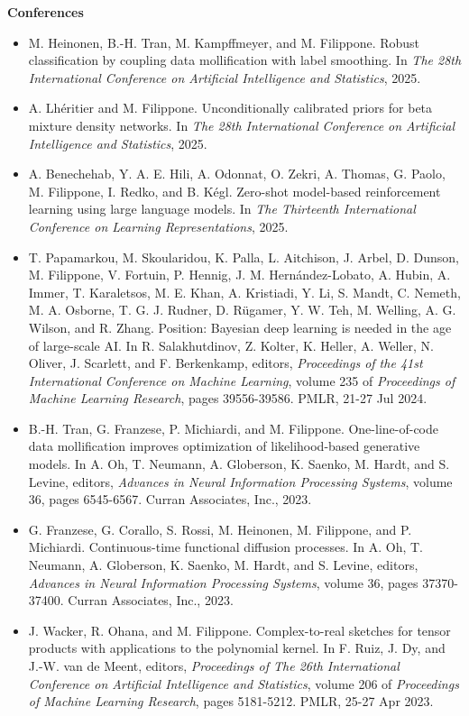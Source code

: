 \begin{itemize}
\end{itemize}\textbf{Conferences}\begin{itemize}\item  M. Heinonen, B.-H. Tran, M. Kampffmeyer, and M. Filippone. Robust classification by coupling data mollification with label smoothing. In \emph{The 28th International Conference on Artificial Intelligence and Statistics}, 2025.  
\item  A. Lh\'eritier and M. Filippone. Unconditionally calibrated priors for beta mixture density networks. In \emph{The 28th International Conference on Artificial Intelligence and Statistics}, 2025.  
\item  A. Benechehab, Y. A. E. Hili, A. Odonnat, O. Zekri, A. Thomas, G. Paolo, M. Filippone, I. Redko, and B. K\'egl. Zero-shot model-based reinforcement learning using large language models. In \emph{The Thirteenth International Conference on Learning Representations}, 2025.  
\item  T. Papamarkou, M. Skoularidou, K. Palla, L. Aitchison, J. Arbel, D. Dunson, M. Filippone, V. Fortuin, P. Hennig, J. M. Hern\'andez-Lobato, A. Hubin, A. Immer, T. Karaletsos, M. E. Khan, A. Kristiadi, Y. Li, S. Mandt, C. Nemeth, M. A. Osborne, T. G. J. Rudner, D. R\"ugamer, Y. W. Teh, M. Welling, A. G. Wilson, and R. Zhang. Position: Bayesian deep learning is needed in the age of large-scale AI. In R. Salakhutdinov, Z. Kolter, K. Heller, A. Weller, N. Oliver, J. Scarlett, and F. Berkenkamp, editors, \emph{Proceedings of the 41st International Conference on Machine Learning}, volume 235 of \emph{Proceedings of Machine Learning Research}, pages 39556-39586. PMLR, 21-27 Jul 2024.  
\item  B.-H. Tran, G. Franzese, P. Michiardi, and M. Filippone. One-line-of-code data mollification improves optimization of likelihood-based generative models. In A. Oh, T. Neumann, A. Globerson, K. Saenko, M. Hardt, and S. Levine, editors, \emph{Advances in Neural Information Processing Systems}, volume 36, pages 6545-6567. Curran Associates, Inc., 2023.  
\item  G. Franzese, G. Corallo, S. Rossi, M. Heinonen, M. Filippone, and P. Michiardi. Continuous-time functional diffusion processes. In A. Oh, T. Neumann, A. Globerson, K. Saenko, M. Hardt, and S. Levine, editors, \emph{Advances in Neural Information Processing Systems}, volume 36, pages 37370-37400. Curran Associates, Inc., 2023.  
\item  J. Wacker, R. Ohana, and M. Filippone. Complex-to-real sketches for tensor products with applications to the polynomial kernel. In F. Ruiz, J. Dy, and J.-W. van de Meent, editors, \emph{Proceedings of The 26th International Conference on Artificial Intelligence and Statistics}, volume 206 of \emph{Proceedings of Machine Learning Research}, pages 5181-5212. PMLR, 25-27 Apr 2023.  

\end{itemize}
